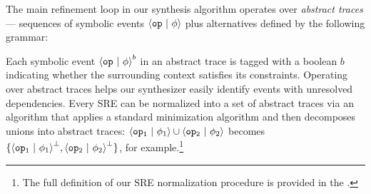 The main refinement loop in our synthesis algorithm operates over
\emph{abstract traces} --- sequences of symbolic events
${\langle} {\boldsymbol{{\tt op}}~|~{\phi}} {\rangle}$ plus alternatives defined by the following grammar: %
\vspace{-.4cm} \par{}\noindent Each symbolic event ${\langle} {\boldsymbol{{\tt op}}~|~{\phi}} {\rangle}^b$ in
an abstract trace is tagged with a boolean $b$ indicating whether the
surrounding context satisfies its constraints. Operating over abstract
traces helps our synthesizer easily identify events with unresolved
dependencies. Every SRE can be normalized into a set of abstract
traces via an algorithm that applies a standard minimization algorithm
and then decomposes unions into abstract traces:
${\langle} {\boldsymbol{{\tt op_1}}~|~{\phi_1}} {\rangle} \cup {\langle} {\boldsymbol{{\tt op_2}}~|~{\phi_2}} {\rangle}$ becomes
$\{{\langle} {\boldsymbol{{\tt op_1}}~|~{\phi_1}} {\rangle}^\bot, {\langle} {\boldsymbol{{\tt op_2}}~|~{\phi_2}} {\rangle}^\bot\}$, for
example.\footnote{The full definition of our SRE normalization
  procedure is provided in the \techreport{}.}

